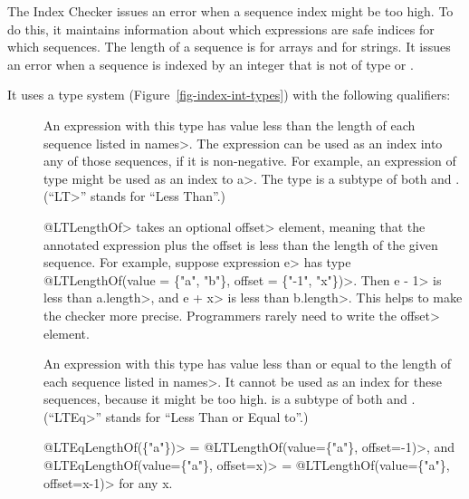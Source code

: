 
The Index Checker issues an error when a sequence index might be
too high. To do this, it maintains information about which expressions are
safe indices for which sequences.
The length of a sequence is  for arrays and
 for strings.
It issues an error when a sequence 
is indexed by an integer that is not of type 
or .

It uses a type system (Figure~\ref{fig-index-int-types}) with the following
qualifiers:

\begin{description}

\item[]
  An expression with this type
  has value less than the length of each sequence listed in \<names>.
  The expression can be used as an index into any of those sequences,
  if it is non-negative.
  For example, an expression of type  might be
  used as an index to \<a>.
  The type  is a subtype of both
   and .
  (``\<LT>'' stands for ``Less Than''.)

  \<@LTLengthOf> takes an optional \<offset> element, meaning that the
  annotated expression plus the offset is less than the length of the given
  sequence.  For example, suppose expression \<e> has type \<@LTLengthOf(value
  = \{"a", "b"\}, offset = \{"-1", "x"\})>. Then \<e - 1> is less than
  \<a.length>, and \<e + x> is less than \<b.length>.  This helps to make
  the checker more precise.  Programmers rarely need to write the \<offset>
  element.

\item[]
  An expression with this type
  has value less than or equal to the length of each sequence listed in \<names>.
  It cannot be used as an index for these sequences, because it might be too high.
   is a subtype of both
   and .
  (``\<LTEq>'' stands for ``Less Than or Equal to''.)

  \<@LTEqLengthOf(\{"a"\})> = \<@LTLengthOf(value=\{"a"\}, offset=-1)>, and \\
  \<@LTEqLengthOf(value=\{"a"\}, offset=x)> = \<@LTLengthOf(value=\{"a"\},
  offset=x-1)> for any x.


\end{description}
